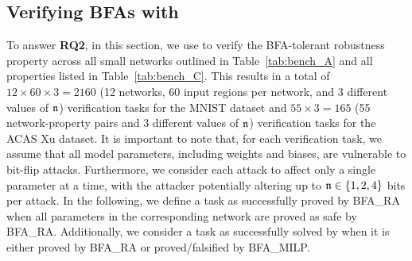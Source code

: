 \subsection{Verifying BFAs with \tool}\label{sec:exp_tool_small}
To answer \textbf{RQ2}, in this section, we use \tool to verify the BFA-tolerant robustness property across all small networks outlined in Table~\ref{tab:bench_A}  and all properties listed in Table~\ref{tab:bench_C}. This results in a total of $12\times 60\times 3=2160$ (12 networks, 60 input regions per network, and 3 different values of $\mathfrak{n}$) verification tasks for the MNIST dataset and $55\times 3 =165$ (55 network-property pairs and 3 different values of $\mathfrak{n}$) verification tasks for the ACAS Xu dataset. It is important to note that, for each verification task, we assume that all model parameters, including weights and biases, are vulnerable to bit-flip attacks. Furthermore, we consider each attack to affect only a single parameter at a time, with the attacker potentially altering up to $\mathfrak{n}\in\{1,2,4\}$ bits per attack.
% 
% 
In the following, we define a task as successfully proved by {\sf BFA\_RA} when all parameters in the corresponding network are proved as safe by {\sf BFA\_RA}. Additionally, we consider a task as successfully solved by \tool when it is either proved by {\sf BFA\_RA} or proved/falsified by {\sf BFA\_MILP}.

\begin{table}[t]
    \centering
    \caption{Verification results of \tool on ACAS Xu}\label{tab:tool_acas}
    \setlength{\tabcolsep}{2pt}
\end{table}

